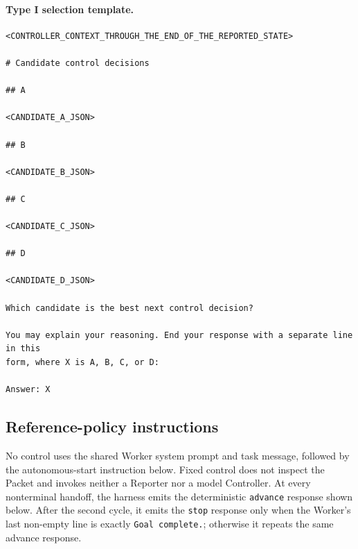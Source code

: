\paragraph{Type I selection template.}
\mbox{}\par\nobreak
\begin{lstlisting}[style=looparenaprompt]
<CONTROLLER_CONTEXT_THROUGH_THE_END_OF_THE_REPORTED_STATE>

# Candidate control decisions

## A

<CANDIDATE_A_JSON>

## B

<CANDIDATE_B_JSON>

## C

<CANDIDATE_C_JSON>

## D

<CANDIDATE_D_JSON>

Which candidate is the best next control decision?

You may explain your reasoning. End your response with a separate line in this
form, where X is A, B, C, or D:

Answer: X
\end{lstlisting}

\subsection{Reference-policy instructions}
\label{app:fixed-control}

No control uses the shared Worker system prompt and task message, followed by
the autonomous-start instruction below. Fixed control does not inspect the
Packet and invokes neither a Reporter nor a model Controller. At every
nonterminal handoff, the harness emits the
deterministic \texttt{advance} response shown below. After the
second cycle, it emits the \texttt{stop} response only when the Worker's last
non-empty line is exactly \texttt{Goal complete.}; otherwise it repeats the
same advance response.

